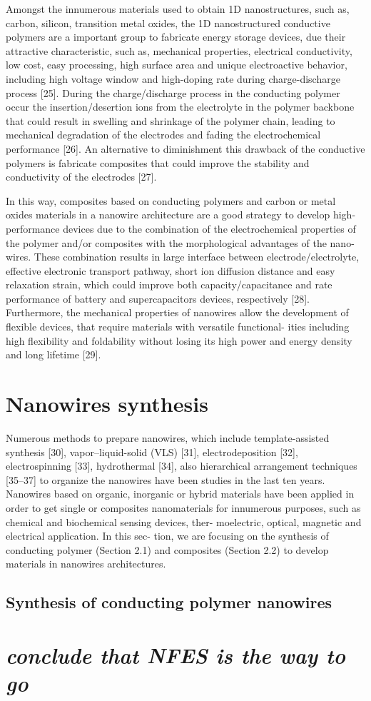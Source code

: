 Amongst the innumerous materials used to obtain 1D nanostructures, such as, carbon, silicon, transition metal oxides, the 1D nanostructured conductive polymers are a important group to fabricate energy storage devices, due their attractive characteristic, such as, mechanical properties, electrical conductivity, low cost, easy processing, high surface area and unique electroactive behavior, including high voltage window and high-doping rate during charge-discharge process [25]. During the charge/discharge process in the conducting polymer occur the insertion/desertion ions from the electrolyte in the polymer backbone that could result in swelling and shrinkage of the polymer chain, leading to mechanical degradation of the electrodes and fading the electrochemical performance [26]. An alternative to diminishment this drawback of the conductive polymers is fabricate composites that could improve the stability and conductivity of the electrodes [27].

In this way, composites based on conducting polymers and carbon or metal oxides materials in a nanowire architecture are a good strategy to develop high-performance devices due to the combination of the electrochemical properties of the polymer and/or composites with the morphological advantages of the nano- wires. These combination results in large interface between electrode/electrolyte, effective electronic transport pathway, short ion diffusion distance and easy relaxation strain, which could improve both capacity/capacitance and rate performance of battery and supercapacitors devices, respectively [28]. Furthermore, the mechanical properties of nanowires allow the development of flexible devices, that require materials with versatile functional- ities including high flexibility and foldability without losing its high power and energy density and long lifetime [29].

\section{Nanowires synthesis}

Numerous methods to prepare nanowires, which include template-assisted synthesis [30], vapor–liquid-solid (VLS) [31], electrodeposition [32], electrospinning [33], hydrothermal [34], also hierarchical arrangement techniques [35–37] to organize the nanowires have been studies in the last ten years. Nanowires based on organic, inorganic or hybrid materials have been applied in order to get single or composites nanomaterials for innumerous purposes, such as chemical and biochemical sensing devices, ther- moelectric, optical, magnetic and electrical application. In this sec- tion, we are focusing on the synthesis of conducting polymer (Section 2.1) and composites (Section 2.2) to develop materials in nanowires architectures.

\subsection{Synthesis of conducting polymer nanowires}



\section{\emph{conclude that NFES is the way to go}}